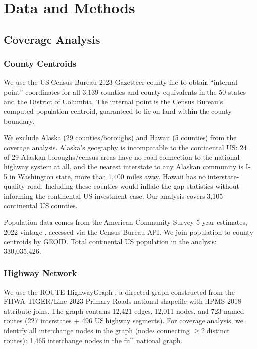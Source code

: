 \section{Data and Methods}

\subsection{Coverage Analysis}

\subsubsection{County Centroids}

We use the US Census Bureau 2023 Gazetteer county file \citep{Census_TIGER2023} to obtain ``internal point'' coordinates for all 3,139 counties and county-equivalents in the 50 states and the District of Columbia. The internal point is the Census Bureau's computed population centroid, guaranteed to lie on land within the county boundary.

We exclude Alaska (29 counties/boroughs) and Hawaii (5 counties) from the coverage analysis. Alaska's geography is incomparable to the continental US: 24 of 29 Alaskan boroughs/census areas have no road connection to the national highway system at all, and the nearest interstate to any Alaskan community is I-5 in Washington state, more than 1,400 miles away. Hawaii has no interstate-quality road. Including these counties would inflate the gap statistics without informing the continental US investment case. Our analysis covers 3,105 continental US counties.

Population data comes from the American Community Survey 5-year estimates, 2022 vintage \citep{ACS2022}, accessed via the Census Bureau API. We join population to county centroids by GEOID. Total continental US population in the analysis: 330,035,426.

\subsubsection{Highway Network}

We use the ROUTE HighwayGraph \citep{ROUTE_CLI2026}: a directed graph constructed from the FHWA TIGER/Line 2023 Primary Roads national shapefile with HPMS 2018 attribute joins. The graph contains 12,421 edges, 12,011 nodes, and 723 named routes (227 interstates + 496 US highway segments). For coverage analysis, we identify all interchange nodes in the graph (nodes connecting $\geq$2 distinct routes): 1,465 interchange nodes in the full national graph.

